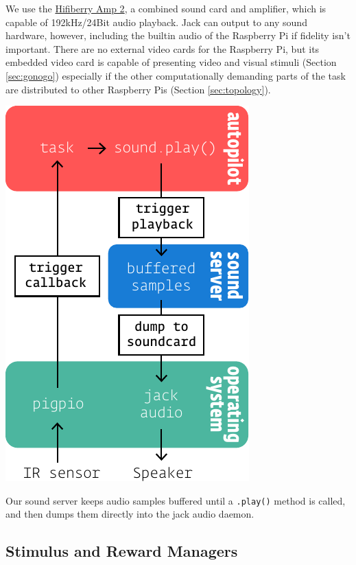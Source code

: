 We use the \href{https://www.hifiberry.com/shop/boards/hifiberry-amp2/}{Hifiberry Amp 2}, a combined sound card and amplifier, which is capable of 192kHz/24Bit audio playback. Jack can output to any sound hardware, however, including the builtin audio of the Raspberry Pi if fidelity isn't important. There are no external video cards for the Raspberry Pi, but its embedded video card is capable of presenting video and visual stimuli (Section \ref{sec:gonogo}) especially if the other computationally demanding parts of the task are distributed to other Raspberry Pis (Section \ref{sec:topology}).

\begin{marginfigure}[0cm]
\includegraphics[]{figures/side_19_soundpath.pdf}
\caption{Our sound server keeps audio samples buffered until a \texttt{.play()} method is called, and then dumps them directly into the jack audio daemon.}
\label{fig:soundpath}
\end{marginfigure}

\subsection{Stimulus and Reward Managers}
\label{sec:managers}

